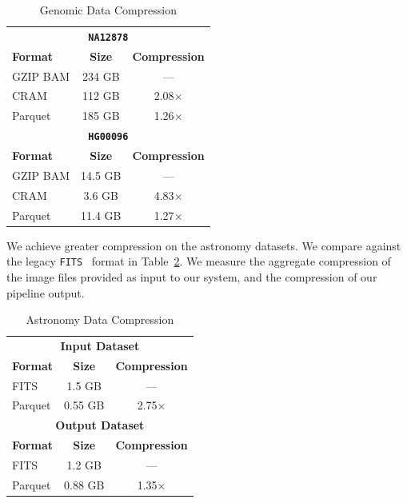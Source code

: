 \documentclass{acm_proc_article-sp}
\begin{document}
\begin{table}[h]
\caption{Genomic Data Compression}
\label{tab:genomic-compression}
\begin{center}
\begin{tabular}{ l c c }
\hline
\multicolumn{3}{c}{\bf \texttt{NA12878}} \\
\bf Format & \bf Size & \bf Compression \\
\hline
\hline
GZIP BAM & 234 GB & --- \\
CRAM & 112 GB & 2.08$\times$ \\
Parquet & 185 GB & 1.26$\times$ \\
\hline
\multicolumn{3}{c}{\bf \texttt{HG00096}} \\
\bf Format & \bf Size & \bf Compression \\
\hline
\hline
GZIP BAM & 14.5 GB & --- \\
CRAM & 3.6 GB & 4.83$\times$ \\
Parquet & 11.4 GB & 1.27$\times$ \\
\hline
\end{tabular}
\end{center}
\end{table}

We achieve greater compression on the astronomy datasets. We compare against the legacy
\texttt{FITS}~\cite{wells81} format in Table~\ref{tab:astro-compression}. We measure the aggregate compression of the
image files provided as input to our system, and the compression of our pipeline output.

\begin{table}[h]
\caption{Astronomy Data Compression}
\label{tab:astro-compression}
\begin{center}
\begin{tabular}{ l c c }
\hline
\multicolumn{3}{c}{\bf Input Dataset} \\
\bf Format & \bf Size & \bf Compression \\
\hline
\hline
FITS & 1.5 GB & --- \\
Parquet & 0.55 GB & 2.75$\times$ \\
\hline
\multicolumn{3}{c}{\bf Output Dataset} \\
\bf Format & \bf Size & \bf Compression \\
\hline
\hline
FITS & 1.2 GB & --- \\
Parquet & 0.88 GB & 1.35$\times$ \\
\hline
\end{tabular}
\end{center}
\end{table}
\end{document}
